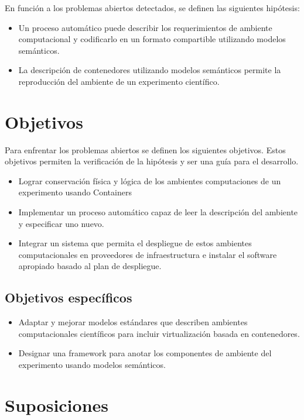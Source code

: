 En función a los problemas abiertos detectados, se definen las siguientes hipótesis:

\begin{itemize}
	\item Un proceso automático puede describir los requerimientos de ambiente computacional y codificarlo en un formato compartible utilizando modelos semánticos.
	\item La descripción de contenedores utilizando modelos semánticos permite la reproducción del ambiente de un experimento científico.
\end{itemize}


\section{Objetivos}

Para enfrentar los problemas abiertos se definen los siguientes objetivos. Estos objetivos permiten la verificación de la hipótesis y ser una guía para el desarrollo.

\begin{itemize}
	\item Lograr conservación física y lógica de los ambientes computaciones de un experimento usando Containers
	\item Implementar un proceso automático capaz de leer la descripción del ambiente y especificar uno nuevo.
	\item Integrar un sistema que permita el despliegue de estos ambientes computacionales en proveedores de infraestructura e instalar el software apropiado basado al plan de despliegue.
\end{itemize}

\subsection{Objetivos específicos}

\begin{itemize}
	\item Adaptar y mejorar modelos estándares que describen ambientes computacionales científicos para incluir virtualización basada en contenedores.
	\item Designar una framework para anotar los componentes de ambiente del experimento usando modelos semánticos.
\end{itemize}

\section{Suposiciones}

